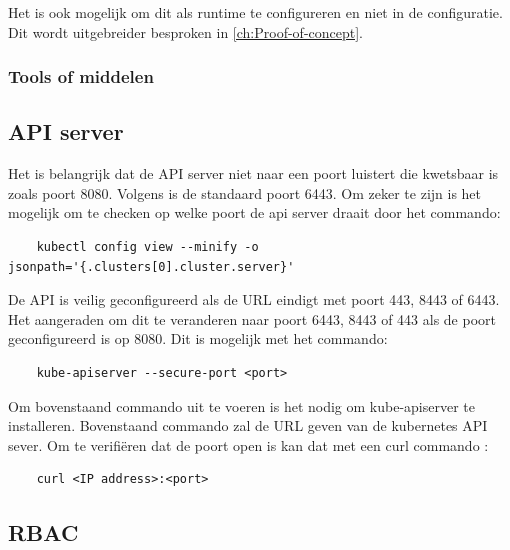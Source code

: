 Het is ook mogelijk om dit als runtime te configureren en niet in de configuratie. Dit wordt uitgebreider besproken in \ref{ch:Proof-of-concept}. 

\subsubsection{Tools of middelen}

\subsection{API server}
Het is belangrijk dat de API server niet naar een poort luistert die kwetsbaar is zoals poort 8080. Volgens \autocite{KubernetesDocs-2023} is de standaard poort 6443. Om zeker te zijn is het mogelijk om te checken op welke poort de api server draait door het commando:
\begin{verbatim}
    kubectl config view --minify -o jsonpath='{.clusters[0].cluster.server}'
\end{verbatim}

De API is veilig geconfigureerd als de URL eindigt met poort 443, 8443 of 6443. Het aangeraden om dit te veranderen naar poort 6443, 8443 of 443 als de poort geconfigureerd is op 8080. Dit is mogelijk met het commando:
\begin{verbatim}
    kube-apiserver --secure-port <port>
\end{verbatim}

Om bovenstaand commando uit te voeren is het nodig om kube-apiserver te installeren. 
Bovenstaand commando zal de URL geven van de kubernetes API sever. Om te verifiëren dat de poort open is kan dat met een curl commando \autocite{Rice2018}:
\begin{verbatim}
    curl <IP address>:<port>
\end{verbatim}


\subsection{RBAC}
